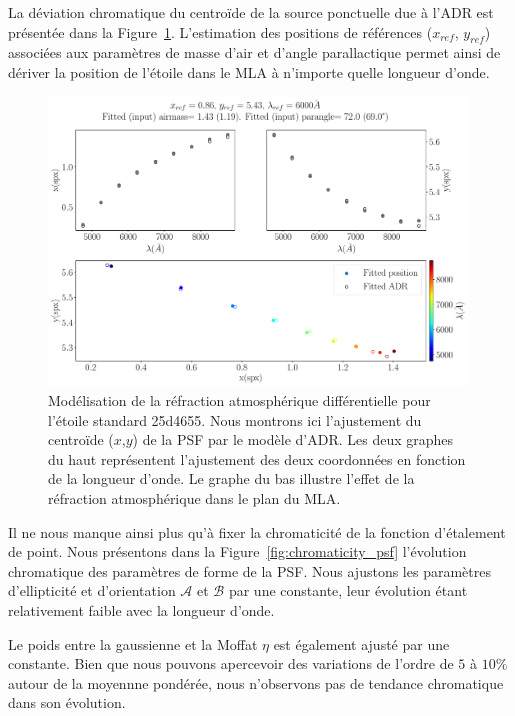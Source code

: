 \documentclass[../main/main.tex]{subfiles}
\begin{document}
La déviation chromatique du centroïde de la source ponctuelle due à
l'ADR est présentée dans la Figure~\ref{fig:adr_std}. L'estimation des
positions de références ($x_{ref}$, $y_{ref}$) associées aux 
paramètres de masse d'air et d'angle parallactique permet ainsi de
dériver la position de l'étoile dans le MLA à n'importe quelle longueur d'onde.

\begin{figure}
  \centering
  \includegraphics[width=0.99\textwidth]{../figures/06_irf/adr_std.pdf}
  \caption[Modélisation de la réfraction atmosphérique
  différentielle]{Modélisation de la réfraction atmosphérique
    différentielle pour l'étoile standard 25d4655. Nous montrons ici
    l'ajustement du centroïde ($x$,$y$) de la PSF par le modèle
    d'ADR. Les deux graphes du haut représentent l'ajustement des deux
    coordonnées en fonction de la longueur d'onde. Le graphe du bas
    illustre l'effet de la réfraction atmosphérique dans le plan du MLA.}
  \label{fig:adr_std}
\end{figure}

Il ne nous manque ainsi plus qu'à fixer la chromaticité de la fonction
d'étalement de point.
Nous présentons dans la Figure~\ref{fig:chromaticity_psf} l'évolution
chromatique des paramètres de forme de la PSF. Nous ajustons les
paramètres d'ellipticité et d'orientation $\mathcal{A}$ et $\mathcal{B}$
par une constante, leur évolution étant relativement faible avec la longueur d'onde.

Le poids entre la gaussienne et la Moffat $\eta$ est également ajusté
par une constante. Bien que nous pouvons apercevoir des variations de
l'ordre de $5$ à $10\%$ autour de la moyennne pondérée, nous n'observons pas
de tendance chromatique dans son évolution.
\end{document}
